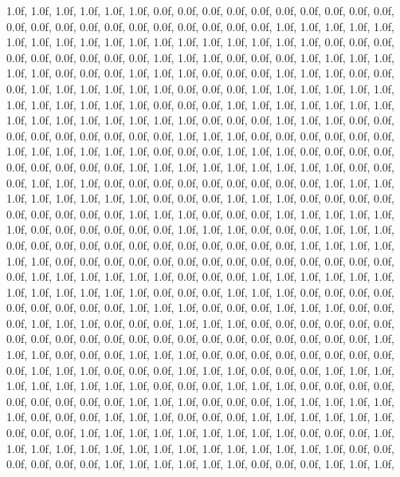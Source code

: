 {   1.0f, 1.0f, 1.0f,   1.0f, 1.0f, 1.0f,   0.0f, 0.0f, 0.0f,   0.0f, 0.0f, 0.0f,   0.0f, 0.0f, 0.0f,   0.0f, 0.0f, 0.0f,   0.0f, 0.0f, 0.0f,   0.0f, 0.0f, 0.0f,   0.0f, 0.0f, 0.0f,   1.0f, 1.0f, 1.0f,   1.0f, 1.0f, 1.0f,   1.0f, 1.0f, 1.0f,   1.0f, 1.0f, 1.0f,   1.0f, 1.0f, 1.0f,   1.0f, 1.0f, 1.0f,   0.0f, 0.0f, 0.0f,   0.0f, 0.0f, 0.0f,   0.0f, 0.0f, 0.0f,   1.0f, 1.0f, 1.0f,   0.0f, 0.0f, 0.0f,   1.0f, 1.0f, 1.0f,   1.0f, 1.0f, 1.0f,   0.0f, 0.0f, 0.0f,   1.0f, 1.0f, 1.0f,   0.0f, 0.0f, 0.0f,   1.0f, 1.0f, 1.0f,   0.0f, 0.0f, 0.0f,   1.0f, 1.0f, 1.0f,   1.0f, 1.0f, 1.0f,   0.0f, 0.0f, 0.0f,   1.0f, 1.0f, 1.0f,   1.0f, 1.0f, 1.0f,   
   1.0f, 1.0f, 1.0f,   1.0f, 1.0f, 1.0f,   0.0f, 0.0f, 0.0f,   1.0f, 1.0f, 1.0f,   1.0f, 1.0f, 1.0f,   1.0f, 1.0f, 1.0f,   1.0f, 1.0f, 1.0f,   1.0f, 1.0f, 1.0f,   0.0f, 0.0f, 0.0f,   1.0f, 1.0f, 1.0f,   0.0f, 0.0f, 0.0f,   0.0f, 0.0f, 0.0f,   0.0f, 0.0f, 0.0f,   1.0f, 1.0f, 1.0f,   0.0f, 0.0f, 0.0f,   0.0f, 0.0f, 0.0f,   1.0f, 1.0f, 1.0f,   1.0f, 1.0f, 1.0f,   0.0f, 0.0f, 0.0f,   1.0f, 1.0f, 1.0f,   0.0f, 0.0f, 0.0f,   0.0f, 0.0f, 0.0f,   0.0f, 0.0f, 0.0f,   1.0f, 1.0f, 1.0f,   1.0f, 1.0f, 1.0f,   1.0f, 1.0f, 1.0f,   0.0f, 0.0f, 0.0f,   1.0f, 1.0f, 1.0f,   0.0f, 0.0f, 0.0f,   0.0f, 0.0f, 0.0f,   0.0f, 0.0f, 0.0f,   1.0f, 1.0f, 1.0f,   
   1.0f, 1.0f, 1.0f,   1.0f, 1.0f, 1.0f,   0.0f, 0.0f, 0.0f,   1.0f, 1.0f, 1.0f,   0.0f, 0.0f, 0.0f,   0.0f, 0.0f, 0.0f,   0.0f, 0.0f, 0.0f,   1.0f, 1.0f, 1.0f,   0.0f, 0.0f, 0.0f,   1.0f, 1.0f, 1.0f,   1.0f, 1.0f, 1.0f,   0.0f, 0.0f, 0.0f,   0.0f, 0.0f, 0.0f,   1.0f, 1.0f, 1.0f,   0.0f, 0.0f, 0.0f,   1.0f, 1.0f, 1.0f,   0.0f, 0.0f, 0.0f,   0.0f, 0.0f, 0.0f,   0.0f, 0.0f, 0.0f,   0.0f, 0.0f, 0.0f,   1.0f, 1.0f, 1.0f,   1.0f, 1.0f, 1.0f,   0.0f, 0.0f, 0.0f,   0.0f, 0.0f, 0.0f,   0.0f, 0.0f, 0.0f,   0.0f, 0.0f, 0.0f,   0.0f, 0.0f, 0.0f,   1.0f, 1.0f, 1.0f,   1.0f, 1.0f, 1.0f,   0.0f, 0.0f, 0.0f,   1.0f, 1.0f, 1.0f,   1.0f, 1.0f, 1.0f,   
   1.0f, 1.0f, 1.0f,   1.0f, 1.0f, 1.0f,   0.0f, 0.0f, 0.0f,   1.0f, 1.0f, 1.0f,   0.0f, 0.0f, 0.0f,   0.0f, 0.0f, 0.0f,   0.0f, 0.0f, 0.0f,   1.0f, 1.0f, 1.0f,   0.0f, 0.0f, 0.0f,   1.0f, 1.0f, 1.0f,   0.0f, 0.0f, 0.0f,   1.0f, 1.0f, 1.0f,   0.0f, 0.0f, 0.0f,   1.0f, 1.0f, 1.0f,   0.0f, 0.0f, 0.0f,   0.0f, 0.0f, 0.0f,   0.0f, 0.0f, 0.0f,   0.0f, 0.0f, 0.0f,   0.0f, 0.0f, 0.0f,   0.0f, 0.0f, 0.0f,   0.0f, 0.0f, 0.0f,   1.0f, 1.0f, 1.0f,   0.0f, 0.0f, 0.0f,   1.0f, 1.0f, 1.0f,   0.0f, 0.0f, 0.0f,   0.0f, 0.0f, 0.0f,   0.0f, 0.0f, 0.0f,   1.0f, 1.0f, 1.0f,   0.0f, 0.0f, 0.0f,   1.0f, 1.0f, 1.0f,   0.0f, 0.0f, 0.0f,   1.0f, 1.0f, 1.0f,   
   1.0f, 1.0f, 1.0f,   1.0f, 1.0f, 1.0f,   0.0f, 0.0f, 0.0f,   1.0f, 1.0f, 1.0f,   0.0f, 0.0f, 0.0f,   0.0f, 0.0f, 0.0f,   0.0f, 0.0f, 0.0f,   1.0f, 1.0f, 1.0f,   0.0f, 0.0f, 0.0f,   1.0f, 1.0f, 1.0f,   1.0f, 1.0f, 1.0f,   0.0f, 0.0f, 0.0f,   1.0f, 1.0f, 1.0f,   0.0f, 0.0f, 0.0f,   1.0f, 1.0f, 1.0f,   1.0f, 1.0f, 1.0f,   0.0f, 0.0f, 0.0f,   1.0f, 1.0f, 1.0f,   1.0f, 1.0f, 1.0f,   1.0f, 1.0f, 1.0f,   0.0f, 0.0f, 0.0f,   1.0f, 1.0f, 1.0f,   1.0f, 1.0f, 1.0f,   1.0f, 1.0f, 1.0f,   1.0f, 1.0f, 1.0f,   1.0f, 1.0f, 1.0f,   0.0f, 0.0f, 0.0f,   0.0f, 0.0f, 0.0f,   1.0f, 1.0f, 1.0f,   1.0f, 1.0f, 1.0f,   0.0f, 0.0f, 0.0f,   1.0f, 1.0f, 1.0f,   
}
